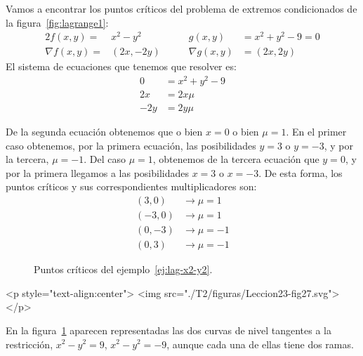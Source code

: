 \begin{ejemplo}\label{ej:lag-x2-y2}
Vamos a encontrar los puntos críticos del problema de extremos condicionados de la figura~\ref{fig:lagrange1}:
\begin{alignat*}{2}
f(x,y)=&x^2-y^2\qquad\qquad &g(x,y)&=x^2+y^2-9=0\\
\nabla f(x,y)=&(2x,-2y)& \nabla g(x,y)&=(2x,2y)
\end{alignat*}
El sistema de ecuaciones que tenemos que resolver es:
%
\begin{align*}
0&=x^2+y^2-9\\
2x &= 2x\mu \\
-2y &= 2y\mu
\end{align*}

%
De la segunda ecuación obtenemos que o bien $x=0$ o bien $\mu=1$. En el primer caso obtenemos, por la primera ecuación, las posibilidades $y=3$ o $y=-3$, y por la tercera, $\mu=-1$.
Del caso $\mu=1$, obtenemos de la tercera ecuación que $y=0$, y por la primera llegamos a las posibilidades
$x=3$ o $x=-3$.
De esta forma, los puntos críticos y sus correspondientes multiplicadores son:
\begin{align*}
(3,0) &\to \mu =1\\
(-3,0) &\to  \mu =1\\
(0,-3) &\to  \mu =-1\\
(0,3) &\to  \mu =-1
\end{align*}
%
\begin{figure}[t]
\begin{center}
\end{center}
\caption{Puntos críticos del ejemplo~\ref{ej:lag-x2-y2}.}
\label{fig:lag-x2-y2}
\end{figure}
\begin{rawhtml}
<p style="text-align:center">
    <img src="./T2/figuras/Leccion23-fig27.svg"></p>
\end{rawhtml}
%
En la figura~\ref{fig:lag-x2-y2} aparecen representadas las dos curvas de nivel tangentes a la restricción, $x^2-y^2=9$, $x^2-y^2=-9$, aunque cada una de ellas tiene dos ramas.\newline
\rule{0pt}{0pt}\hfill\fej
\end{ejemplo}

